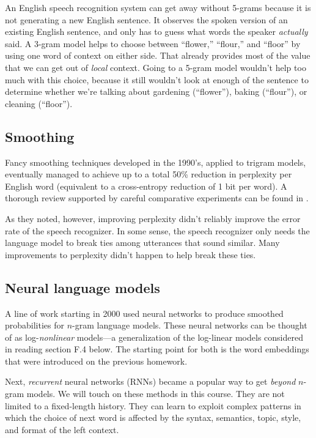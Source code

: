 An English speech recognition system can get away without 5-grams because it is not generating a new English sentence. It observes the spoken version of an existing English sentence, and only has to guess what words the speaker \textit{actually} said. A 3-gram model helps to choose between “flower,” “flour,” and “floor” by using one word of context on either side. That already provides most of the value that we can get out of \textit{local} context. Going to a 5-gram model wouldn’t help too much with this choice, because it still wouldn’t look at enough of the sentence to determine whether we’re talking about gardening (“flower”), baking (“flour”), or cleaning (“floor”).

\subsection*{Smoothing}
Fancy smoothing techniques developed in the 1990’s, applied to trigram models, eventually managed to achieve up to a total 50\% reduction in perplexity per English word (equivalent to a cross-entropy reduction of 1 bit per word). A thorough review supported by careful comparative experiments can be found in \cite{Goodman2001}.

As they noted, however, improving perplexity didn’t reliably improve the error rate of the speech recognizer. In some sense, the speech recognizer only needs the language model to break ties among utterances that sound similar. Many improvements to perplexity didn’t happen to help break these ties.

\subsection*{Neural language models}
A line of work starting in 2000 used neural networks to produce smoothed probabilities for $n$-gram language models. These neural networks can be thought of as log-\textit{nonlinear} models—a generalization of the log-linear models considered in reading section F.4 below. The starting point for both is the word embeddings that were introduced on the previous homework.

Next, \textit{recurrent} neural networks (RNNs) became a popular way to get \textit{beyond} $n$-gram models. We will touch on these methods in this course. They are not limited to a fixed-length history. They can learn to exploit complex patterns in which the choice of next word is affected by the syntax, semantics, topic, style, and format of the left context.

